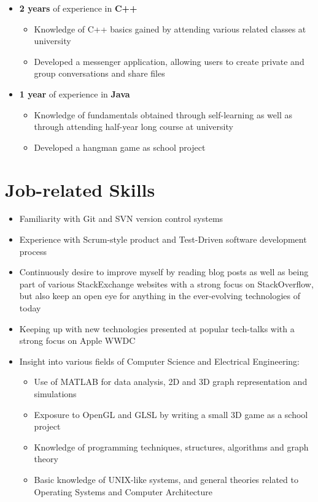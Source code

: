 \documentclass[11pt, a4paper, sans]{moderncv}
\begin{document}
\begin{itemize}
{\begin{itemize}
	\end{itemize}}
\item {\textbf{2 years} of experience in \textbf{C++}}
	{\begin{itemize}
		\item Knowledge of C++ basics gained by attending various related classes at university 
		\item Developed a messenger application, allowing users to create private and group conversations and share files
	\end{itemize}}
\item {\textbf{1 year} of experience in \textbf{Java}}
	{\begin{itemize}
		\item Knowledge of fundamentals obtained through self-learning as well as through attending half-year long course at university
		\item Developed a hangman game as school project
	\end{itemize}}
\end{itemize}

\section{Job-related Skills}
\begin{itemize}
\item Familiarity with Git and SVN version control systems
\item Experience with Scrum-style product and Test-Driven software development process
\item Continuously desire to improve myself by reading blog posts as well as being part of various StackExchange websites with a strong focus on StackOverflow, but also keep an open eye for anything in the ever-evolving technologies of today
\item Keeping up with new technologies presented at popular tech-talks with a strong focus on Apple WWDC
\item Insight into various fields of Computer Science and Electrical Engineering:
{\begin{itemize}
	\item Use of MATLAB for data analysis, 2D and 3D graph representation and simulations
	\item Exposure to OpenGL and GLSL by writing a small 3D game as a school project
	\item Knowledge of programming techniques, structures, algorithms and graph theory
	\item Basic knowledge of UNIX-like systems, and general theories related to Operating Systems and Computer Architecture
\end{itemize}}
\end{itemize}
\end{document}
